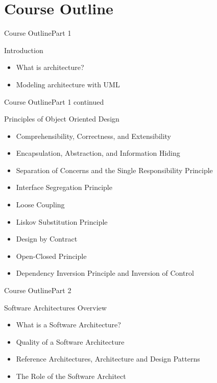 \section{Course Outline}

\begin{frame}{Course Outline}{Part 1}
    \begin{block}{Introduction}
       \begin{itemize}
           \item What is architecture?
           \item Modeling architecture with UML
       \end{itemize}
    \end{block}
\end{frame}

\begin{frame}{Course Outline}{Part 1 continued}
    \begin{block}{Principles of Object Oriented Design}
       \begin{itemize}
           \item Comprehensibility, Correctness, and Extensibility
           \item Encapsulation, Abstraction, and Information Hiding
           \item Separation of Concerns and the Single Responsibility Principle
           \item Interface Segregation Principle
           \item Loose Coupling 
           \item Liskov Substitution Principle
           \item Design by Contract
           \item Open-Closed Principle
           \item Dependency Inversion Principle and Inversion of Control
       \end{itemize}
    \end{block}
\end{frame}

\begin{frame}{Course Outline}{Part 2}
    \begin{block}{Software Architectures Overview}
       \begin{itemize}
           \item What is a Software Architecture?
           \item Quality of a Software Architecture
           \item Reference Architectures, Architecture and Design Patterns
           \item The Role of the Software Architect
       \end{itemize}
    \end{block}
\end{frame}

